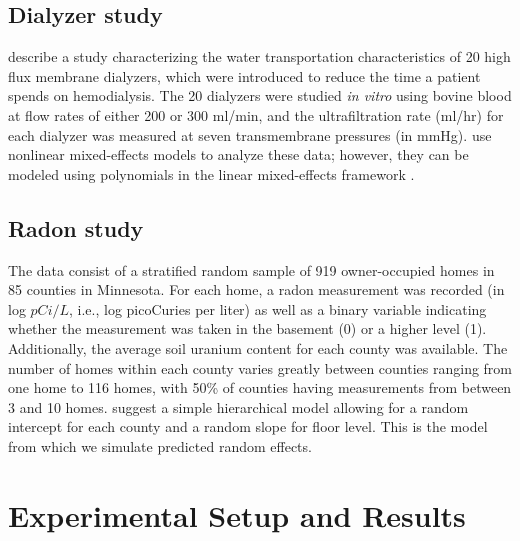 \documentclass[12pt]{article} %
\begin{document}
\subsection{Dialyzer study}\label{data:dialyzer}

\cite{Vonesh:1992us} describe a study characterizing the water transportation characteristics of 20 high flux membrane dialyzers, which were introduced to reduce the time a patient spends on hemodialysis. The 20 dialyzers were studied \emph{in vitro} using bovine blood at flow rates of either 200 or 300 ml/min, and the ultrafiltration rate (ml/hr) for each dialyzer was measured at seven transmembrane pressures (in mmHg). \cite{Vonesh:1992us} use nonlinear mixed-effects models to analyze these data; however, they can be modeled using polynomials in the linear mixed-effects framework \citep[see][Section 9.5]{Littell:2006}.

\subsection{Radon study}\label{data:radon}

The data consist of a stratified random sample of 919 owner-occupied homes in 85 counties in Minnesota. For each home, a radon measurement was recorded (in log $pCi/L$, i.e., log picoCuries per liter) as well as a binary variable indicating whether the measurement was taken in the basement (0) or a higher level (1). Additionally, the average soil uranium content for each county was available. The number of homes within each county varies greatly between counties ranging from one home to 116 homes, with 50\% of counties having measurements from between 3 and 10 homes. \cite{Gelman:2006ue} suggest a simple hierarchical model allowing for a random intercept for each county and a random slope for floor level. This is the model from which we simulate predicted random effects.

\section{Experimental Setup and Results}\label{study}
\end{document}
